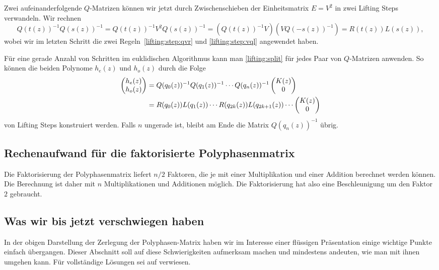 Zwei aufeinanderfolgende $Q$-Matrizen können wir jetzt durch Zwischenschieben
der Einheitsmatrix $E=V^2$ in zwei Lifting Steps verwandeln.
Wir rechnen
\begin{equation}
Q(t(z))^{-1}Q(s(z))^{-1}
=
Q(t(z))^{-1}V^2Q(s(z))^{-1}
=
(Q(t(z))^{-1}V)(VQ(-s(z))^{-1})
=
R(t(z)) L(s(z)),
\label{lifting:split}
\end{equation}
wobei wir im letzten Schritt die zwei Regeln~\eqref{lifting:step:qvr}
und \eqref{lifting:step:vql} angewendet haben.

Für eine gerade Anzahl von Schritten im euklidischen Algorithmus 
kann man \eqref{lifting:split} für jedes Paar von $Q$-Matrizen anwenden.
So können die beiden Polynome $h_e(z)$ und $h_o(z)$ durch die Folge
\begin{align}
\begin{pmatrix} h_e(z)\\h_o(z)\end{pmatrix}
&=
Q(q_0(z))^{-1}
Q(q_1(z))^{-1}
\cdots
Q(q_n(z))^{-1}
\begin{pmatrix}K(z)\\ 0 \end{pmatrix}
\notag
\\
&=
R(q_0(z)) L(q_1(z)) \cdots R(q_{2k}(z)) L(q_{2k+1}(z)) \cdots 
\begin{pmatrix}K(z)\\ 0 \end{pmatrix}
\label{lifting:faktorisierung}
\end{align}
von Lifting Steps konstruiert werden.
Falls $n$ ungerade ist, bleibt am Ende die Matrix $Q(q_n(z))^{-1}$
übrig.

\subsection{Rechenaufwand für die faktorisierte Polyphasenmatrix}
Die Faktorisierung der Polyphasenmatrix liefert $n/2$ Faktoren,
die je mit einer Multiplikation und einer Addition berechnet werden
können.
Die Berechnung ist daher mit $n$ Multiplikationen und Additionen
möglich.
Die Faktorisierung hat also eine Beschleunigung um den Faktor $2$ 
gebraucht.

\subsection{Was wir bis jetzt verschwiegen haben
\label{lifting:verschwiegen}}
In der obigen Darstellung der Zerlegung der Polyphasen-Matrix 
haben wir im Interesse einer flüssigen Präsentation einige
wichtige Punkte einfach übergangen.
Dieser Abschnitt soll auf diese Schwierigkeiten aufmerksam machen
und mindestens andeuten, wie man mit ihnen umgehen kann.
Für vollständige Lösungen sei auf \cite{lifting:Daubechies1998} verwiesen.

